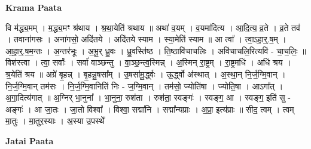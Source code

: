 \documentclass[17pt]{extarticle}
\begin{document}
\textbf{Krama Paata} \newline

वि म॑द्ध्य॒मम् । म॒द्ध्य॒मꣳ श्र॑थाय । श्र॒था॒येति॑ श्रथाय ॥ अथा॑ व॒यम् । व॒यमा॑दित्य । आ॒दि॒त्य॒ व्र॒ते । व्र॒ते तव॑ । तवाना॑गसः । अना॑गसो॒ अदि॑तये । अदि॑तये स्याम । स्या॒मेति॑ स्याम ॥ आ त्वा᳚ । त्वा॒ऽहा॒र्॒.ष॒म् । आ॒हा॒र्॒.ष॒म॒न्तः । अ॒न्तर॑भूः । अ॒भू॒र् ध्रु॒वः । ध्रु॒वस्ति॑ष्ठ । ति॒ष्ठावि॑चाचलिः । अवि॑चाचलि॒रित्यवि॑ - चा॒च॒लिः॒ ॥ विश॑स्त्वा । त्वा॒ सर्वाः᳚ । सर्वा॑ वाञ्छन्तु । वा॒ञ्छ॒न्त्व॒स्मिन्न् । अ॒स्मिन् रा॒ष्ट्रम् । रा॒ष्ट्रमधि॑ । अधि॑ श्रय । श्र॒येति॑ श्रय ॥ अग्रे॑ बृ॒हन्न् । बृ॒हन्नु॒षसा᳚म् । उ॒षसा॑मू॒र्द्ध्वः । ऊ॒र्द्ध्वो अ॑स्थात् । अ॒स्था॒न् नि॒र्ज॒ग्मि॒वान् । नि॒र्ज॒ग्मि॒वान् तम॑सः । नि॒र्ज॒ग्मि॒वानिति॑ निः - ज॒ग्मि॒वान् । तम॑सो॒ ज्योति॑षा । ज्योति॒षा । आऽगा᳚त् । अ॒गा॒दित्य॑गात् ॥ अ॒ग्निर् भा॒नुना᳚ । भा॒नुना॒ रुश॑ता । रुश॑ता॒ स्वङ्गः॑ । स्वङ्ग॒ आ । स्वङ्ग॒ इति॑ सु - अङ्गः॑ । आ जा॒तः । जा॒तो विश्वा᳚ । विश्वा॒ सद्मा॑नि । सद्मा᳚न्यप्राः । अ॒प्रा॒ इत्य॑प्राः ॥ सीद॒ त्वम् । त्वम् मा॒तुः । मा॒तुर॒स्याः । अ॒स्या उ॒पस्थे᳚ \newline

\textbf{Jatai Paata} \newline
\end{document}
